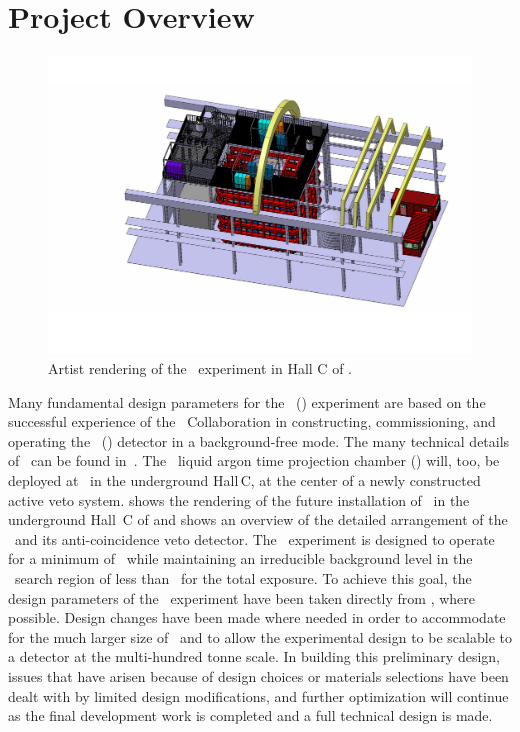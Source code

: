 \section{Project Overview}
\label{sec:ProjectOverview}

\begin{figure}[t!]
\includegraphics[width=\textwidth]{./Figures/DSk-Overall.pdf}
\caption[Artist rendering of the \DSks\ experiment in Hall C of \LNGS]{Artist rendering of the \DSks\ experiment in Hall C of \LNGS.}
\label{fig:Overall-Design}
\end{figure}

Many fundamental design parameters for the \DSk\ (\DSks) experiment are based on the successful experience of the \DS\ Collaboration in constructing, commissioning, and operating the \DSf\ (\DSfs) detector in a background-free mode. The many technical details of \DSf\ can be found in~\cite{Agnes:2015gu,Agnes:2016cp,Agnes:2016fw,Agnes:2016fz,Agnes:2016tx,Agnes:2017ck,Agnes:2017cl,Agnes:2017cz,Agnes:2017ec,Agnes:2018cn,Agnes:2018dt,Agnes:2018ep,Agnes:2018fg,Agnes:2018ft}.  The \DSks\ liquid argon time projection chamber (\LArTPC) will, too, be deployed at \LNGS\ in the underground Hall\,C, at the center of a newly constructed active veto system.   shows the rendering of the future installation of \DSks\ in the underground Hall~C of \LNGS and  shows an overview of the detailed arrangement of the \LArTPC\ and its anti-coincidence veto detector.  The \DSks\ experiment is designed to operate for a minimum of \DSkExtendedRunTimePlanned\ while maintaining an irreducible background level in the \WIMP\ search region of less than \BackgroundFreeRequirement\ for the total exposure.  To achieve this goal, the design parameters of the \DSks\ experiment have been taken directly from \DSfs, where possible.  Design changes have been made where needed in order to accommodate for the much larger size of \DSks\ and to allow the experimental design to be scalable to a detector at the multi-hundred tonne scale.  In building this preliminary design, issues that have arisen because of design choices or materials selections have been dealt with by limited design modifications, and further optimization will continue as the final development work is completed and a full technical design is made.  

